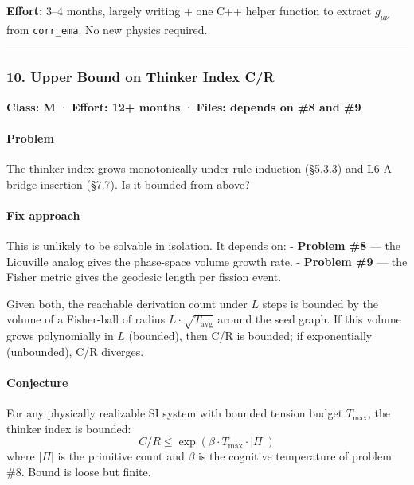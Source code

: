 \documentclass[
  11pt,
  a4paper,
]{article}
\begin{document}
\textbf{Effort:} 3--4 months, largely writing + one C++ helper function
to extract \(g_{\mu\nu}\) from \texttt{corr\_ema}. No new physics
required.

\begin{center}\rule{0.5\linewidth}{0.5pt}\end{center}

\subsubsection{10. Upper Bound on Thinker Index
C/R}\label{upper-bound-on-thinker-index-cr-1}

\textbf{Class: M} · \textbf{Effort: 12+ months} · \textbf{Files: depends
on \#8 and \#9}

\paragraph{Problem}\label{problem-9}

The thinker index grows monotonically under rule induction (§5.3.3) and
L6-A bridge insertion (§7.7). Is it bounded from above?

\paragraph{Fix approach}\label{fix-approach-2}

This is unlikely to be solvable in isolation. It depends on: -
\textbf{Problem \#8} --- the Liouville analog gives the phase-space
volume growth rate. - \textbf{Problem \#9} --- the Fisher metric gives
the geodesic length per fission event.

Given both, the reachable derivation count under \(L\) steps is bounded
by the volume of a Fisher-ball of radius \(L \cdot \sqrt{T_\text{avg}}\)
around the seed graph. If this volume grows polynomially in \(L\)
(bounded), then C/R is bounded; if exponentially (unbounded), C/R
diverges.

\paragraph{Conjecture}\label{conjecture}

For any physically realizable SI system with bounded tension budget
\(T_\text{max}\), the thinker index is bounded: \[
C/R \leq \exp(\beta \cdot T_\text{max} \cdot |\Pi|)
\] where \(|\Pi|\) is the primitive count and \(\beta\) is the cognitive
temperature of problem \#8. Bound is loose but finite.
\end{document}
